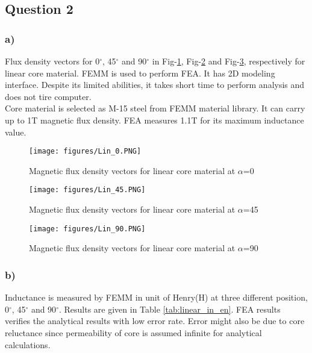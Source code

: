 \documentclass[11pt, a4paper]{article}
\begin{document}
\subsection*{Question 2}

\subsubsection*{a)}

Flux density vectors for 0$^\circ$, 45$^\circ$ and 90$^\circ$ in Fig-\ref{Lin_0}, Fig-\ref{Lin_45} and Fig-\ref{Lin_90}, respectively for linear core material. FEMM is used to perform FEA. It has 2D modeling interface. Despite its limited abilities, it takes short time to perform analysis and does not tire computer.\\

Core material is selected as M-15 steel from FEMM material library. It can carry up to 1T magnetic flux density. FEA measures 1.1T for its maximum inductance value. \\

\begin{figure}[ht]
\centering
\texttt{[image: figures/Lin\_0.PNG]}
\caption{Magnetic flux density vectors for linear core material at $\alpha$=0 } \label{Lin_0}
\end{figure}

\begin{figure}[ht]
\centering
\texttt{[image: figures/Lin\_45.PNG]}
\caption{Magnetic flux density vectors for linear core material at $\alpha$=45 } \label{Lin_45}
\end{figure}

\begin{figure}[ht]
\centering
\texttt{[image: figures/Lin\_90.PNG]}
\caption{Magnetic flux density vectors for linear core material at $\alpha$=90 } \label{Lin_90}
\end{figure}



\subsubsection*{b)}

Inductance is measured by FEMM in unit of Henry(H) at three different position, 0$^\circ$, 45$^\circ$ and 90$^\circ$. Results are given in Table \ref{tab:linear_in_en}. FEA results verifies the analytical results with low error rate. Error might also be due to core reluctance since permeability of core is assumed infinite for analytical calculations.\\
\end{document}
